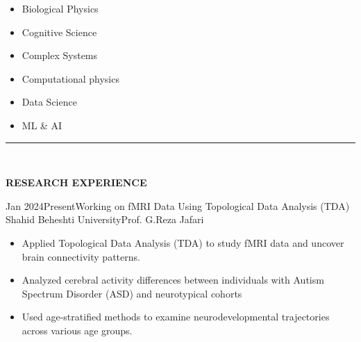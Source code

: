 \documentclass[11pt, b4paper]{cv}
\begin{document}
\begin{multicols}{3}
	\begin{itemize}
		\setlength\itemsep{-1pt}
		\item Biological Physics
		\item Cognitive Science
		\item Complex Systems
		\item Computational physics
		\item Data Science
		\item ML \& AI
	\end{itemize}
\end{multicols}


\vspace{-0.15in}
\rule{\textwidth}{1pt}\\
\vspace{-0.15in}

\textbf{RESEARCH EXPERIENCE}\\
\vspace{-0.13in}

 \begin{research_exp}{Jan 2024}{Present}{Working on fMRI Data Using Topological Data Analysis (TDA)
 	}{Shahid Beheshti University}{Prof. G.Reza Jafari}
	 
	 \begin{itemize}
	 \item Applied Topological Data Analysis (TDA) to study fMRI data and uncover brain connectivity patterns.
	 \item Analyzed cerebral activity differences between individuals with Autism Spectrum Disorder (ASD) and neurotypical cohorts
	 \item Used age-stratified methods to examine neurodevelopmental trajectories across various age groups.
	\end{itemize}
\end{research_exp}
\vspace{-0.1in}
\end{document}
